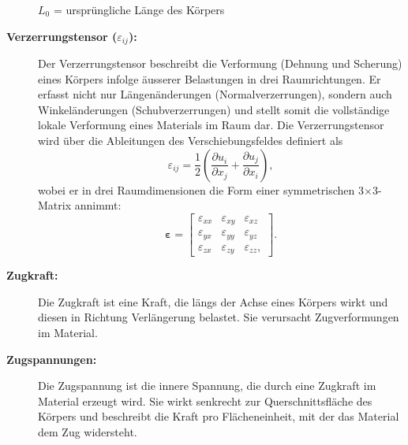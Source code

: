 \begin{description}
	$L_0$ = ursprüngliche Länge des Körpers
	
\item[\textbf{Verzerrungstensor ($\varepsilon_{ij}$):}] Der Verzerrungstensor beschreibt die Verformung (Dehnung und Scherung) eines Körpers infolge äusserer Belastungen in drei Raumrichtungen. 
Er erfasst nicht nur Längenänderungen (Normalverzerrungen), sondern auch Winkeländerungen (Schubverzerrungen) und stellt somit die vollständige lokale Verformung eines Materials im Raum dar.
Die Verzerrungstensor wird über die Ableitungen des Verschiebungsfeldes definiert als
	\begin{equation*}
		\varepsilon_{ij} = 
		\frac{1}{2} \left( \frac{\partial u_i}{\partial x_j} + \frac{\partial u_j}{\partial x_i} \right),
	\end{equation*}
	wobei er in drei Raumdimensionen die Form einer symmetrischen 3×3-Matrix annimmt:
	\begin{equation*}
		\boldsymbol{\varepsilon} =
		\begin{bmatrix}
			\varepsilon_{xx} & \varepsilon_{xy} & \varepsilon_{xz} \\
			\varepsilon_{yx} & \varepsilon_{yy} & \varepsilon_{yz} \\
			\varepsilon_{zx} & \varepsilon_{zy} & \varepsilon_{zz},
		\end{bmatrix}.
	\end{equation*}
\item[\textbf{Zugkraft:}] Die Zugkraft ist eine Kraft, die längs der Achse eines Körpers wirkt und diesen in Richtung Verlängerung belastet. 
Sie verursacht Zugverformungen im Material.
	
\item[\textbf{Zugspannungen:}] Die Zugspannung ist die innere Spannung, die durch eine Zugkraft im Material erzeugt wird. 
Sie wirkt senkrecht zur Querschnittsfläche des Körpers und beschreibt die Kraft pro Flächeneinheit, mit der das Material dem Zug widersteht.
\end{description}

